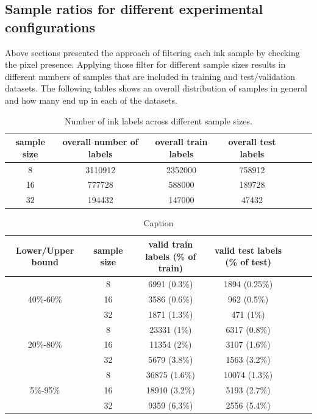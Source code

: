 \documentclass[runningheads]{llncs}
\begin{document}
\subsection*{Sample ratios for different experimental configurations}
Above sections presented the approach of filtering each ink sample by checking the pixel presence. Applying those filter for different sample sizes results in different numbers of samples that are included in training and test/validation datasets. The following tables shows an overall distribution of samples in general and how many end up in each of the datasets.
\begin{table}[]
    \centering
    \caption{Number of ink labels across different sample sizes.}
    \begin{tabular}{|c|c|c|c|c|c|c|}
        \hline
        sample size & overall number of labels & overall train labels & overall test labels\\
        \hline
         8&3110912&2352000&758912\\
         16&777728&588000&189728\\
         32&194432&147000&47432\\
         \hline
    \end{tabular}
    
    \label{tab:placeholder}
\end{table}
\begin{table}[]
    \centering
    \caption{Caption}
    \begin{tabular}{|c|c|c|c|c|c|c|}
        \hline
        Lower/Upper bound & sample size & valid train labels (\% of train) & valid test labels (\% of test)  \\
        \hline
          &8&6991 (0.3\%)&1894 (0.25\%)\\
         40\%-60\%&16&3586 (0.6\%)&962 (0.5\%)\\
         &32&1871 (1.3\%)&471 (1\%)\\
         \hline
          &8&23331 (1\%)&6317 (0.8\%)\\
         20\%-80\%&16&11354 (2\%)&3107 (1.6\%)\\
         &32&5679 (3.8\%)&1563 (3.2\%)\\
         \hline
          &8&36875 (1.6\%)&10074 (1.3\%)\\
         5\%-95\%&16&18910 (3.2\%)&5193 (2.7\%)\\
         &32&9359 (6.3\%)&2556 (5.4\%)\\
         \hline
    \end{tabular}
    
    \label{tab:placeholder}
\end{table}
\end{document}

